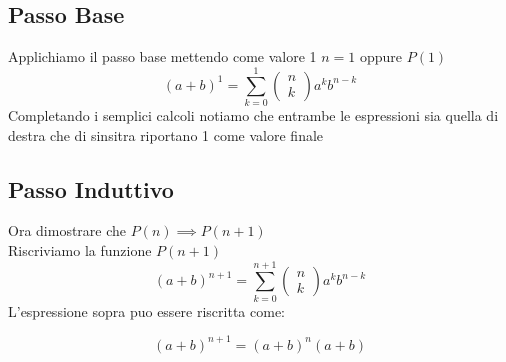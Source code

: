 \documentclass{article}
\begin{document}
\begin{flushleft}
   \subsection{Passo Base}
   Applichiamo il passo base mettendo come valore 1 $n=1$ oppure $P(1)$
   \begin{equation}
        (a+b)^1= \sum_{k=0}^{1}
        \begin{pmatrix}
            n\\
            k
        \end{pmatrix}a^kb^{n-k}
   \end{equation}
   Completando i semplici calcoli notiamo che entrambe le espressioni sia quella di destra che di sinsitra riportano 1 come valore finale
   \subsection{Passo Induttivo}
    Ora dimostrare che $P(n) \implies P(n+1)$\\
    Riscriviamo la funzione $P(n+1)$
    \begin{equation}
        (a+b)^{n+1}= \sum_{k=0}^{n+1}
        \begin{pmatrix}
            n\\
            k
        \end{pmatrix}a^kb^{n-k}
    \end{equation}
    L'espressione sopra puo essere riscritta come:

    \begin{equation}
       (a+b)^{n+1}=(a+b)^n(a+b)
    \end{equation}


\end{flushleft}
\end{document}
